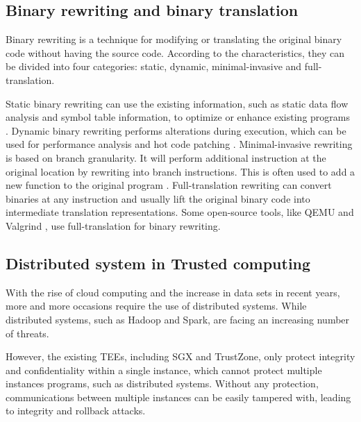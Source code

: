 
\subsection{Binary rewriting and binary translation}
Binary rewriting is a technique for modifying or translating the original binary code
without having the source code. According to the characteristics, they can be divided
into four categories: static, dynamic, minimal-invasive and full-translation.

Static binary rewriting can use the existing information, such as static data flow analysis and
symbol table information, to optimize or enhance existing programs \cite{10.1145/2629335, Schwarz2007PLTOAL}.
Dynamic binary rewriting performs alterations during execution, which can be used for
performance analysis \cite{Luk2005PinBC} and hot code patching \cite{Bruening2003AnIF}.
Minimal-invasive rewriting is based on branch granularity. It will perform additional instruction
at the original location by rewriting into branch instructions. This is often used to add a new
function to the original program \cite{Federico2017revngAU}.
Full-translation rewriting can convert binaries at any instruction and usually lift the original
binary code into intermediate translation representations. Some open-source tools,
like QEMU \cite{Bellard2005QEMUAF} and Valgrind \cite{Nethercote2007ValgrindAF},
use full-translation for binary rewriting.


\subsection{Distributed system in Trusted computing}
With the rise of cloud computing and the increase in data sets in recent years,
more and more occasions require the use of distributed systems.
While distributed systems, such as Hadoop and Spark, are facing an increasing number
of threats.

However, the existing TEEs, including SGX and TrustZone, only protect integrity
and confidentiality within a single instance, which cannot protect multiple
instances programs, such as distributed systems.
Without any protection, communications between multiple instances can be easily
tampered with, leading to integrity and rollback attacks.

